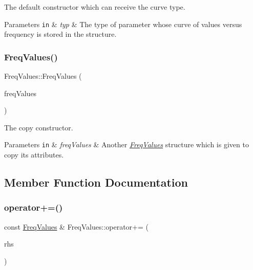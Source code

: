 The default constructor which can receive the curve type. 


\begin{DoxyParams}[1]{Parameters}
\mbox{\tt in}  & {\em typ} & The type of parameter whose curve of values versus frequency is stored in the structure. \\
\hline
\end{DoxyParams}
\mbox{\label{structFreqValues_a7061709cf9faa8e7ee6cf2d15fd30a66}} 
\subsubsection{\texorpdfstring{Freq\+Values()}{FreqValues()}\hspace{0.1cm}{\footnotesize\ttfamily [2/2]}}
{\footnotesize\ttfamily Freq\+Values\+::\+Freq\+Values (\begin{DoxyParamCaption}\item[{const \hyperlink{structFreqValues}{Freq\+Values} \&}]{freq\+Values }\end{DoxyParamCaption})\hspace{0.3cm}{\ttfamily [inline]}}



The copy constructor. 


\begin{DoxyParams}[1]{Parameters}
\mbox{\tt in}  & {\em freq\+Values} & Another {\itshape \hyperlink{structFreqValues}{Freq\+Values}} structure which is given to copy its attributes. \\
\hline
\end{DoxyParams}


\subsection{Member Function Documentation}
\mbox{\label{structFreqValues_a8024942907aaf5fd4aaa49850bbe6cd5}} 
\subsubsection{\texorpdfstring{operator+=()}{operator+=()}}
{\footnotesize\ttfamily const \hyperlink{structFreqValues}{Freq\+Values} \& Freq\+Values\+::operator+= (\begin{DoxyParamCaption}\item[{const \hyperlink{structFreqValues}{Freq\+Values} \&}]{rhs }\end{DoxyParamCaption})}



